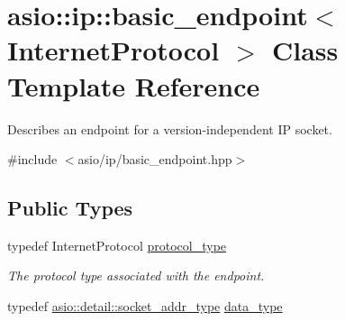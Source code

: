 \hypertarget{classasio_1_1ip_1_1basic__endpoint}{}\section{asio\+:\+:ip\+:\+:basic\+\_\+endpoint$<$ Internet\+Protocol $>$ Class Template Reference}
\label{classasio_1_1ip_1_1basic__endpoint}


Describes an endpoint for a version-\/independent I\+P socket.  




{\ttfamily \#include $<$asio/ip/basic\+\_\+endpoint.\+hpp$>$}

\subsection*{Public Types}
\begin{DoxyCompactItemize}
\item 
typedef Internet\+Protocol \hyperlink{classasio_1_1ip_1_1basic__endpoint_a0a1e636ae6281b37349b7dbdb4791a09}{protocol\+\_\+type}
\begin{DoxyCompactList}\small\item\em The protocol type associated with the endpoint. \end{DoxyCompactList}\item 
typedef \hyperlink{namespaceasio_1_1detail_a40a7b0385a38f87815ffbb8df5e34d05}{asio\+::detail\+::socket\+\_\+addr\+\_\+type} \hyperlink{classasio_1_1ip_1_1basic__endpoint_a080cc84bcb7c39ec426a3670b9456c44}{data\+\_\+type}
\end{DoxyCompactItemize}

